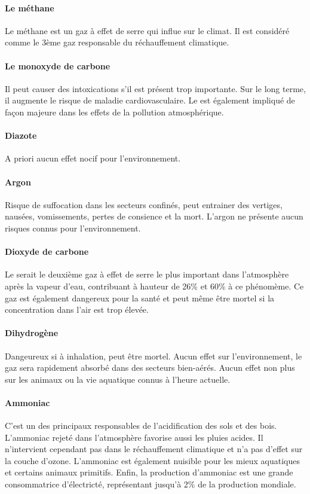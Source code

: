 \paragraph{Le méthane} Le méthane est un gaz à effet de serre qui influe
sur le climat. Il est considéré comme le 3ème gaz responsable du
réchauffement climatique.
\paragraph{Le monoxyde de carbone} Il peut causer des intoxications s'il est
présent trop importante. Sur le long terme, il augmente le risque de maladie
cardiovasculaire. Le  est également impliqué de façon majeure
dans les effets de la pollution atmosphérique.
\paragraph{Diazote} A priori aucun effet nocif pour l'environnement.
\paragraph{Argon} Risque de suffocation dans les secteurs confinés, peut
entrainer des vertiges, nausées, vomissements, pertes de consience et la mort.
L'argon ne présente aucun risques connus pour l'environnement.
\paragraph{Dioxyde de carbone} Le  serait le deuxième
gaz à effet de serre le plus important dans l'atmosphère après la vapeur
d'eau, contribuant à hauteur de 26\% et 60\% à ce phénomème. Ce gaz
est également dangereux pour la santé et peut même être mortel si
la concentration dans l'air est trop élevée.
\paragraph{Dihydrogène} Dangeureux si à inhalation, peut être mortel.
Aucun effet sur l'environnement, le gaz
sera rapidement absorbé dans des secteurs bien-aérés. Aucun
effet non plus sur les animaux ou la vie aquatique connus à l'heure
actuelle.
\paragraph{Ammoniac} C'est un des principaux responsables
de l'acidification des sols et des bois. L'ammoniac rejeté
dans l'atmosphère favorise aussi les pluies acides. Il 
n'intervient cependant pas dans le réchauffement climatique et n'a pas
d'effet sur la couche d'ozone. L'ammoniac
est également nuisible pour les mieux aquatiques et certains
animaux primitifs. Enfin, la production d'ammoniac est une grande
consommatrice d'électricté, représentant jusqu'à 2\% de la
production mondiale.

